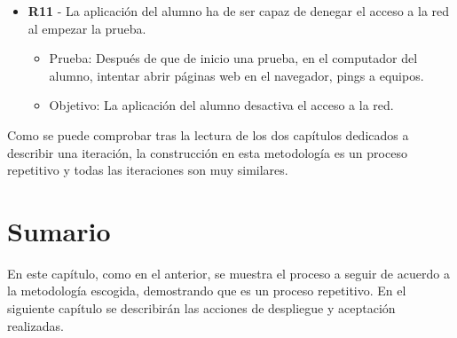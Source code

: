 \begin{itemize}
    \item {\bfseries R11} - La aplicación del alumno ha de ser capaz de denegar el acceso a la red al empezar la prueba.

    \begin{itemize}

        \item Prueba: Después de que de inicio una prueba, en el computador del alumno, intentar abrir páginas web en el navegador, pings a equipos.
        \item Objetivo: La aplicación del alumno desactiva el acceso a la red.
    \end{itemize}

\end{itemize}

Como se puede comprobar tras la lectura de los dos capítulos dedicados a describir una iteración, la construcción en esta metodología es un proceso repetitivo y todas las iteraciones son muy similares.


\section{Sumario}

En este capítulo, como en el anterior, se muestra el proceso a seguir de acuerdo a la metodología escogida, demostrando que es un proceso repetitivo. En el siguiente capítulo se describirán las acciones de despliegue y aceptación realizadas. 